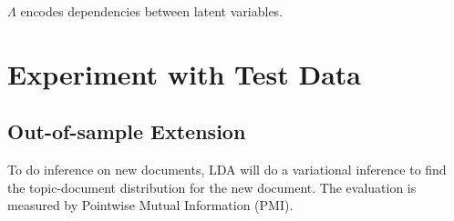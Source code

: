 \documentclass{article}
\begin{document}
$\Lambda$ encodes dependencies between latent variables.




\section{Experiment with Test Data}
\subsection{Out-of-sample Extension}
To do inference on new documents, LDA will do a variational inference to find the topic-document distribution for the new document. The evaluation is measured by Pointwise Mutual Information (PMI).







\end{document}
